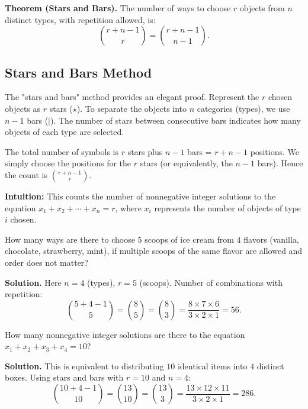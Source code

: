 \documentclass[11pt,a4paper]{article}
\begin{document}
\textbf{Theorem (Stars and Bars).} The number of ways to choose $r$ objects from $n$ distinct types, with repetition allowed, is:
\begin{equation*}
    \binom{r + n - 1}{r} = \binom{r + n - 1}{n - 1}.
\end{equation*}

\subsection{Stars and Bars Method}

The "stars and bars" method provides an elegant proof. Represent the $r$ chosen objects as $r$ stars ($\star$). To separate the objects into $n$ categories (types), we use $n-1$ bars ($|$). The number of stars between consecutive bars indicates how many objects of each type are selected. 

The total number of symbols is $r$ stars plus $n-1$ bars = $r + n - 1$ positions. We simply choose the positions for the $r$ stars (or equivalently, the $n-1$ bars). Hence the count is $\binom{r+n-1}{r}$.

\textbf{Intuition:} This counts the number of nonnegative integer solutions to the equation $x_1 + x_2 + \cdots + x_n = r$, where $x_i$ represents the number of objects of type $i$ chosen.

\begin{example}
How many ways are there to choose $5$ scoops of ice cream from $4$ flavors (vanilla, chocolate, strawberry, mint), if multiple scoops of the same flavor are allowed and order does not matter?

\textbf{Solution.} Here $n = 4$ (types), $r = 5$ (scoops). Number of combinations with repetition:
\begin{equation*}
    \binom{5 + 4 - 1}{5} = \binom{8}{5} = \binom{8}{3} = \frac{8 \times 7 \times 6}{3 \times 2 \times 1} = 56.
\end{equation*}
\end{example}

\begin{example}
How many nonnegative integer solutions are there to the equation $x_1 + x_2 + x_3 + x_4 = 10$?

\textbf{Solution.} This is equivalent to distributing $10$ identical items into $4$ distinct boxes. Using stars and bars with $r = 10$ and $n = 4$:
\begin{equation*}
    \binom{10 + 4 - 1}{10} = \binom{13}{10} = \binom{13}{3} = \frac{13 \times 12 \times 11}{3 \times 2 \times 1} = 286.
\end{equation*}
\end{example}
\end{document}
